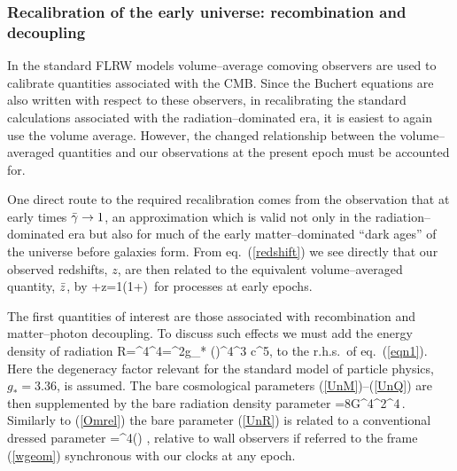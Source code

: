 \documentclass[12pt]{article}
\begin{document}
\subsubsection{Recalibration of the early universe: recombination and
decoupling\br}\br
In the standard FLRW models volume--average comoving observers are used to
calibrate quantities associated with the CMB. Since the Buchert equations
are also written with respect to these observers, in recalibrating the
standard calculations associated with the radiation--dominated era, it is
easiest to again use the volume average. However, the changed relationship
between the volume--averaged quantities and our observations at the present
epoch must be accounted for.

One direct route to the required recalibration comes from the observation
that at early times $\gb\to1$, an approximation which is valid not only
in the radiation--dominated era but also for much of the early
matter--dominated ``dark ages'' of the universe before galaxies form.
From eq.\ (\ref{redshift}) we see directly that our observed redshifts, $z$,
are then related to the equivalent volume--averaged quantity, $\bz$, by
+z={1\over\gc}(1+\bz)\,
\label{redwall}
\eeq
for processes at early epochs.

The first quantities of interest are those associated with recombination
and matter--photon decoupling. To discuss such effects we must add the energy
density of radiation
\beq
\rhb\Z R={\rhb{}\ab{}^4\over\ab^4}={\pi^2g_*}
{(\kB\bT)^4\over\hbar^3 c^5},
\label{rhv_rad}\eeq
to the r.h.s.\ of eq.\ (\ref{eqn1}). Here the degeneracy factor
relevant for the standard model of particle physics, $g_*=3.36$, is
assumed. The bare cosmological parameters (\ref{UnM})--(\ref{UnQ}) are
then supplemented by the bare radiation density parameter
\beq
\OMR={8\pi G\rhb{}\ab{}^4\bH^2\ab^4}\,.\label{UnR}\\
\eeq
Similarly to (\ref{Omrel}) the bare parameter (\ref{UnR}) is related to
a conventional dressed parameter
\beq
\OmR=\gb^4(\tc)\,\OMR\,,
\label{Omrrel}\eeq
relative to wall observers if referred to the frame (\ref{wgeom}) synchronous
with our clocks at any epoch.
\end{document}

